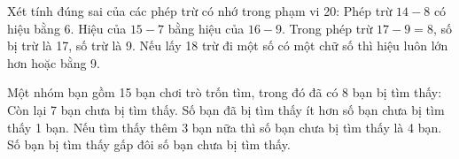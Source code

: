\begin{ex} %
Xét tính đúng sai của các phép trừ có nhớ trong phạm vi 20:
\choiceTF
{\True Phép trừ $14 - 8$ có hiệu bằng $6$.}
{Hiệu của $15 - 7$ bằng hiệu của $16 - 9$.}
{\True Trong phép trừ $17 - 9 = 8$, số bị trừ là 17, số trừ là 9.}
{\True Nếu lấy 18 trừ đi một số có một chữ số thì hiệu luôn lớn hơn hoặc bằng 9.}
\end{ex}

\begin{ex} %
Một nhóm bạn gồm 15 bạn chơi trò trốn tìm, trong đó đã có 8 bạn bị tìm thấy:
\choiceTF
{\True Còn lại 7 bạn chưa bị tìm thấy.}
{Số bạn đã bị tìm thấy ít hơn số bạn chưa bị tìm thấy 1 bạn.}
{\True Nếu tìm thấy thêm 3 bạn nữa thì số bạn chưa bị tìm thấy là 4 bạn.}
{Số bạn bị tìm thấy gấp đôi số bạn chưa bị tìm thấy.}
\end{ex}


